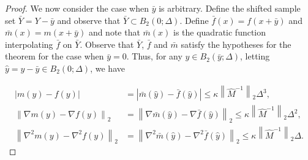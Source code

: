 \documentclass{article}
\begin{document}
\begin{proof}
We now consider the case when $\bar{y}$ is arbitrary.     Define the shifted sample set $\bar{Y}=Y-\bar{y}$ and observe that $\bar{Y} \subset B_2(0;\Delta)$.    Define $\bar{f}(x)= f(x + \bar y)$ and $\bar{m}(x)=m(x+\bar y)$ and note that $\bar{m}(x)$ is the quadratic function interpolating $\bar{f}$ on $\bar{Y}$.     Observe that $\bar{Y}$, $\bar{f}$ and $\bar{m}$ satisfy the hypotheses for the theorem for the case when $\bar{y}=0$.   Thus, for any $y \in B_2(\bar{y};\Delta)$,  letting $\hat{y} = y-\bar{y} \in B_2(0;\Delta)$, we have

\begin{align*}
\left|m(y)-f(y)\right| & = \left|\bar{m}(\hat{y})-\bar{f}(\hat{y})\right| \le \kappa \left\| \hat{M}^{-1} \right\|_2 \Delta^3,\\
\left\|\nabla m(y)-\nabla f(y)\right\|_2 & = \left\|\nabla \bar{m}(\hat{y})-\nabla \bar{f}(\hat{y})\right\|_2 \le \kappa \left\| \hat{M}^{-1} \right\|_2 \Delta^2, \\
\left\|\nabla^2 m(y)-\nabla^2 f(y)\right\|_2 & = \left\|\nabla^2 \bar{m}(\hat{y})- \nabla^2 \bar{f}(\hat{y})\right\|_2 \le \kappa \left\| \hat{M}^{-1} \right\|_2 \Delta.
\end{align*}






%
%
%


\end{proof}
\end{document}
